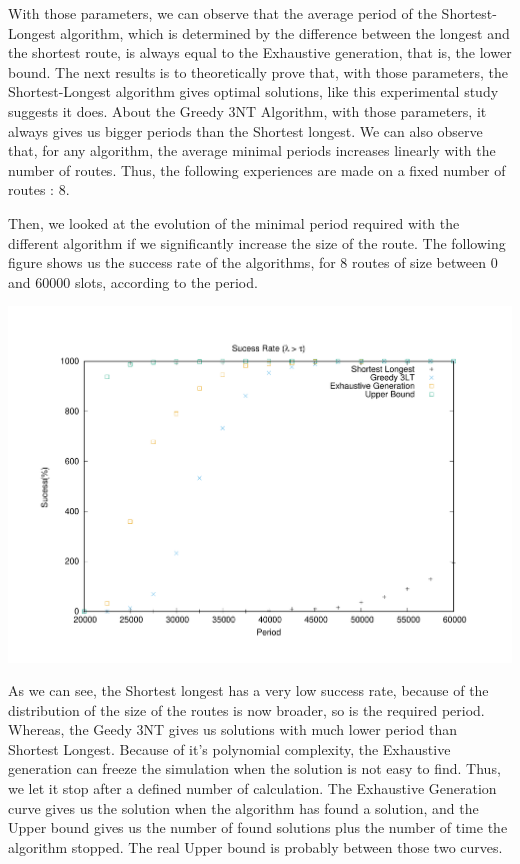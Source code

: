 \documentclass[a4paper,10pt]{article}
\begin{document}
      
     
      With those parameters, we can observe that the average period of the Shortest-Longest algorithm, which is determined by the difference between the longest and the shortest route, is always equal to the Exhaustive generation, that is, the lower bound.
      The next results is to theoretically prove that, with those parameters, the Shortest-Longest algorithm gives optimal solutions, like this experimental study suggests it does. 
      About the Greedy 3NT Algorithm, with those parameters, it always gives us bigger periods than the Shortest longest. 
      We can also observe that, for any algorithm, the average minimal periods increases linearly with the number of routes. Thus, the following experiences are made on a fixed number of routes : 8.
      
      Then, we looked at the evolution of the minimal period required with the different algorithm if we significantly increase the size of the route. The following figure shows us the success rate of the algorithms, for 8 routes of size between 0 and 60000 slots, according to the period.
      
       \begin{center}
      \includegraphics[scale=0.4]{echec_longues.pdf}
      \end{center}
     
      
      As we can see, the Shortest longest has a very low success rate, because of the distribution of the size of the routes is now broader, so is the required period.
      Whereas, the Geedy 3NT gives us solutions with much lower period than Shortest Longest.
      Because of it's polynomial complexity, the Exhaustive generation can freeze the simulation when the solution is not easy to find. Thus, we let it stop after a defined number of calculation. 
      The Exhaustive Generation curve gives us the solution when the algorithm has found a solution, and the Upper bound gives us the number of found solutions plus the number of time the algorithm stopped. The real Upper bound is probably between those two curves.
      
\end{document}
